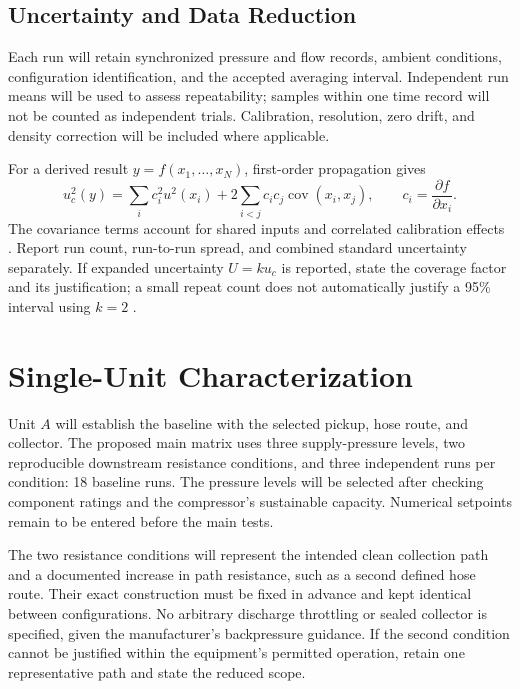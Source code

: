 
\subsection{Uncertainty and Data Reduction}
Each run will retain synchronized pressure and flow records, ambient conditions, configuration identification, and the accepted averaging interval. Independent run means will be used to assess repeatability; samples within one time record will not be counted as independent trials. Calibration, resolution, zero drift, and density correction will be included where applicable.

For a derived result $y=f(x_1,\ldots,x_N)$, first-order propagation gives
\begin{equation}
 u_c^2(y)=\sum_i c_i^2u^2(x_i)
       +2\sum_{i<j}c_i c_j\operatorname{cov}(x_i,x_j),
 \qquad c_i=\frac{\partial f}{\partial x_i}.
 \label{eq:vacuum-uncertainty}
\end{equation}
The covariance terms account for shared inputs and correlated calibration effects \citep{nistUncertaintyPropagation}. Report run count, run-to-run spread, and combined standard uncertainty separately. If expanded uncertainty $U=k u_c$ is reported, state the coverage factor and its justification; a small repeat count does not automatically justify a 95\% interval using $k=2$ \citep{nistExpandedUncertainty}.

\section{Single-Unit Characterization}
\label{sec:single-unit-characterization}
Unit $A$ will establish the baseline with the selected pickup, hose route, and collector. The proposed main matrix uses three supply-pressure levels, two reproducible downstream resistance conditions, and three independent runs per condition: 18 baseline runs. The pressure levels will be selected after checking component ratings and the compressor's sustainable capacity. Numerical setpoints remain to be entered before the main tests.

The two resistance conditions will represent the intended clean collection path and a documented increase in path resistance, such as a second defined hose route. Their exact construction must be fixed in advance and kept identical between configurations. No arbitrary discharge throttling or sealed collector is specified, given the manufacturer's backpressure guidance. If the second condition cannot be justified within the equipment's permitted operation, retain one representative path and state the reduced scope.

